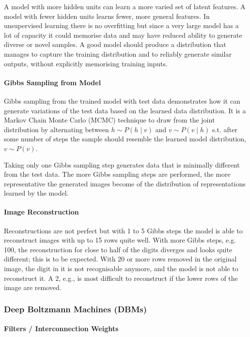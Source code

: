 A model with more hidden units can learn a more varied set of latent features.
A model with fewer hidden units learns fewer, more general features.
In unsupervised learning there is no overfitting but since a very large model has a lot of capacity it
could memorise data and may have reduced ability to generate diverse or novel samples.
A good model should produce a distribution that manages to capture the training distribution
and to reliably generate similar outputs, without explicitly memorising training inputs.

\paragraph{Gibbs Sampling from Model}

Gibbs sampling from the trained model with test data demonstrates how it can
generate variations of the test data based on the learned data distribution.
It is a Markov Chain Monte Carlo (MCMC) technique to draw from the joint distribution by alternating between $h \sim P(h \mid v)$ and $v \sim P(v \mid h)$
s.t. after some number of steps the sample should resemble the learned model distribution, $v \sim P(v)$.

Taking only one Gibbs sampling step generates data that is minimally different from the test data.
The more Gibbs sampling steps are performed, the more representative the generated images become of the distribution of representations learned by the model.

\paragraph{Image Reconstruction}

Reconstructions are not perfect but with 1 to 5 Gibbs steps the model is able to reconstruct images with up to 15 rows quite well.
With more Gibbs steps, e.g. 100, the reconstruction for close to half of the digits diverges and looks quite different; this is to be expected.
With 20 or more rows removed in the original image, the digit in it is not recognisable anymore, and the model is not able to reconstruct it.
A 2, e.g., is most difficult to reconstruct if the lower rows of the image are removed.

\subsubsection{Deep Boltzmann Machines (DBMs)}

\paragraph{Filters / Interconnection Weights}

